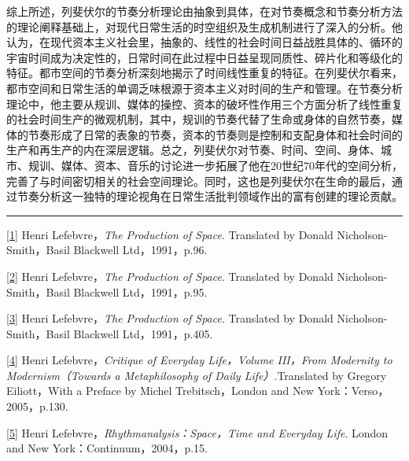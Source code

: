 \documentclass[UTF8, fontset = sourcesans, a4paper, oneside, zihao =
-4, scheme=chinese, no-math, space=true]{ctexbook}
\begin{document}
综上所述，列斐伏尔的节奏分析理论由抽象到具体，在对节奏概念和节奏分析方法的理论阐释基础上，对现代日常生活的时空组织及生成机制进行了深入的分析。他认为，在现代资本主义社会里，抽象的、线性的社会时间日益战胜具体的、循环的宇宙时间成为决定性的，日常时间在此过程中日益呈现同质性、碎片化和等级化的特征。都市空间的节奏分析深刻地揭示了时间线性重复的特征。在列斐伏尔看来，都市空间和日常生活的单调乏味根源于资本主义对时间的生产和管理。在节奏分析理论中，他主要从规训、媒体的操控、资本的破坏性作用三个方面分析了线性重复的社会时间生产的微观机制，其中，规训的节奏代替了生命或身体的自然节奏，媒体的节奏形成了日常的表象的节奏，资本的节奏则是控制和支配身体和社会时间的生产和再生产的内在深层逻辑。总之，列斐伏尔对节奏、时间、空间、身体、城市、规训、媒体、资本、音乐的讨论进一步拓展了他在20世纪70年代的空间分析，完善了与时间密切相关的社会空间理论。同时，这也是列斐伏尔在生命的最后，通过节奏分析这一独特的理论视角在日常生活批判领域作出的富有创建的理论贡献。

\begin{center}\rule{0.5\linewidth}{\linethickness}\end{center}

\protect\hypertarget{part0009_split_004.htmlux5cux23m1}{}{}\protect\hyperlink{part0009_split_000.htmlux5cux23w1}{{[}1{]}}
Henri Lefebvre，\emph{The Production of Space}. Translated by Donald
Nicholson-Smith，Basil Blackwell Ltd，1991，p.96.

\protect\hypertarget{part0009_split_004.htmlux5cux23m2}{}{}\protect\hyperlink{part0009_split_000.htmlux5cux23w2}{{[}2{]}}
Henri Lefebvre，\emph{The Production of Space}. Translated by Donald
Nicholson-Smith，Basil Blackwell Ltd，1991，p.95.

\protect\hypertarget{part0009_split_004.htmlux5cux23m3}{}{}\protect\hyperlink{part0009_split_000.htmlux5cux23w3}{{[}3{]}}
Henri Lefebvre，\emph{The Production of Space}. Translated by Donald
Nicholson-Smith，Basil Blackwell Ltd，1991，p.405.

\protect\hypertarget{part0009_split_004.htmlux5cux23m4}{}{}\protect\hyperlink{part0009_split_000.htmlux5cux23w4}{{[}4{]}}
Henri Lefebvre，\emph{Critique of Everyday Life，Volume III，From
Modernity to Modernism（Towards a Metaphilosophy of Daily
Life）}.Translated by Gregory Eiliott，With a Preface by Michel
Trebitsch，London and New York：Verso，2005，p.130.

\protect\hypertarget{part0009_split_004.htmlux5cux23m5}{}{}\protect\hyperlink{part0009_split_001.htmlux5cux23w5}{{[}5{]}}
Henri Lefebvre，\emph{Rhythmanalysis：Space，Time and Everyday Life}.
London and New York：Continuum，2004，p.15.
\end{document}
